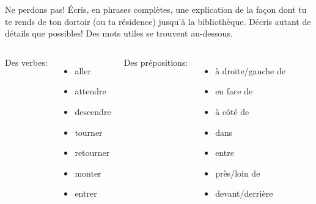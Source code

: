 \begin{frame}{Ne perdons pas!}
  Écris, en phrases complètes, une explication de la façon dont tu te rends de ton dortoir (ou ta résidence) jusqu'à la bibliothèque.
  Décris autant de détails que possibles!
  Des mots utiles se trouvent au-dessous. \\
  \begin{columns}[t]
      Des verbes:
      \begin{itemize}
        \item aller
        \item attendre
        \item descendre
        \item tourner
        \item retourner
        \item monter 
        \item entrer
      \end{itemize}
      Des prépositions:
      \begin{itemize}
        \item à droite/gauche de
        \item en face de
        \item à côté de
        \item dans
        \item entre
        \item près/loin de
        \item devant/derrière
      \end{itemize}
  \end{columns}
\end{frame}